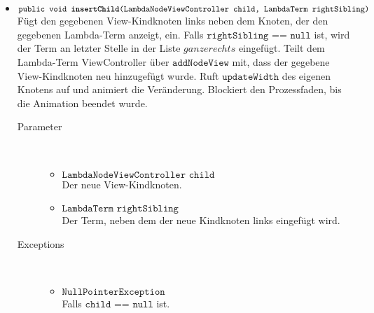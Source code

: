 \begin{description}
\begin{itemize}
		\item $\texttt{public void \textbf{insertChild}(LambdaNodeViewController child, LambdaTerm rightSibling)}$ \\ Fügt den gegebenen View-Kindknoten links neben dem Knoten, der den gegebenen Lambda-Term anzeigt, ein. Falls $\texttt{rightSibling == null}$ ist, wird der Term an letzter Stelle in der Liste \(ganze rechts\) eingefügt. Teilt dem Lambda-Term ViewController über $\texttt{addNodeView}$ mit, dass der gegebene View-Kindknoten neu hinzugefügt wurde. Ruft $\texttt{updateWidth}$ des eigenen Knotens auf und animiert die Veränderung. Blockiert den Prozessfaden, bis die Animation beendet wurde.
		\begin{description}
			\item[Parameter] \hfill \\
			\vspace{-.8cm}
			\begin{itemize}
				\item $\texttt{LambdaNodeViewController child}$ \\ Der neue View-Kindknoten.
				\item $\texttt{LambdaTerm rightSibling}$ \\ Der Term, neben dem der neue Kindknoten links eingefügt wird.
			\end{itemize}
			\item[Exceptions] \hfill \\
			\vspace{-.8cm}
			\begin{itemize}
				\item $\texttt{NullPointerException}$ \\ Falls $\texttt{child == null}$ ist.
			\end{itemize}
		\end{description}
		

\end{itemize}
\end{description}
